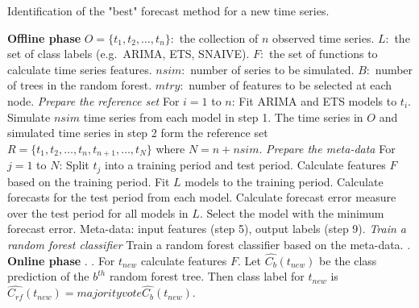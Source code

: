 \documentclass[11pt,a4paper,]{article}
\theoremstyle{definition}
\theoremstyle{definition}
\theoremstyle{definition}
\theoremstyle{remark}
\begin{document}
\begin{algorithm}[!hb]
  \caption{Identification of the "best" forecast method for a new time series.}
  \label{alg:algo-lab}
  \begin{algorithmic}[1]
    \Statex \textbf{Offline phase}
    \Statex {}
    \Statex \hspace{1cm}$O=\{t_1, t_2, \dots,t_n\}:$ the collection of $n$ observed time series.
      \Statex \hspace{1cm}$L:$ the set of class labels (e.g.\ ARIMA, ETS, SNAIVE).
         \Statex \hspace{1cm}$F:$ the set of functions to calculate time series features.
         \Statex \hspace{1cm}$nsim:$ number of series to be simulated.
         \Statex \hspace{1cm}$B:$ number of trees in the random forest.
         \Statex \hspace{1cm}$mtry:$ number of features to be selected at each node.
     \Statex {}
      \Statex \hspace{1cm} 
      \Statex
     \Statex \textit{Prepare the reference set}
    \Statex For $i=1$ to $n$:
            \State Fit ARIMA and ETS models to $t_i$.
            \State Simulate $nsim$ time series from each model in step 1.
            \State The time series in $O$ and simulated time series in step 2 form the reference set $R=\{t_1, t_2, \dots,t_n, t_{n+1},\dots,t_N\}$ where $N = n + nsim$.
    \Statex 
    \Statex \textit{Prepare the meta-data}
    \Statex For $j=1$ to $N$:
            \State Split $t_j$ into a training period and test period.
            \State Calculate features $F$ based on the training period. 
            \State Fit $L$ models to the training period.
            \State Calculate forecasts for the test period from each model.
            \State Calculate forecast error measure over the test period for all models in $L$.
            \State Select the model with the minimum forecast error.
            \State Meta-data: input features (step 5), output labels (step 9).
     \Statex
    \Statex \textit{Train a random forest classifier}
            \State Train a random forest classifier based on the meta-data.
            . 
    \Statex
     \Statex \textbf{Online phase}
    \Statex {}
    \Statex \hspace{1cm} .
     \Statex {}
      \Statex \hspace{1cm}.
  \State For $t_{new}$ calculate features $F$.
  \State Let $\hat{C_b}(t_{new})$ be the class prediction of the $b^{th}$ random forest tree. Then class label for $t_{new}$ is $\hat{C_{rf}}(t_{new})=majorityvote{\hat{C_b}(t_{new})}$.
   \end{algorithmic}
\end{algorithm}
\end{document}
